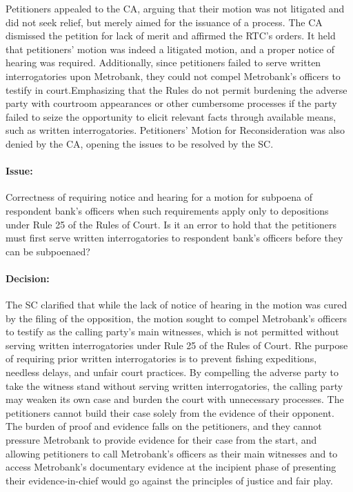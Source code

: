 \documentclass[
12pt,
oneside,
onehalfspacing,
headsepline
]{DigestCollection}
\begin{document}
Petitioners appealed to the CA, arguing that their motion was not litigated and did not seek relief, but merely aimed for the issuance of a process. The CA dismissed the petition for lack of merit and affirmed the RTC's orders. It held that petitioners' motion was indeed a litigated motion, and a proper notice of hearing was required. Additionally, since petitioners failed to serve written interrogatories upon Metrobank, they could not compel Metrobank's officers to testify in court.Emphasizing that the Rules do not permit burdening the adverse party with courtroom appearances or other cumbersome processes if the party failed to seize the opportunity to elicit relevant facts through available means, such as written interrogatories. Petitioners' Motion for Reconsideration was also denied by the CA, opening the issues to be resolved by the SC.

\paragraph{Issue:}
\label{07a37230-09fe-11ef-932c-63c852f65e48}


Correctness of requiring notice and hearing for a motion for subpoena of respondent bank's officers when such requirements apply only to depositions under Rule 25 of the Rules of Court. Is it an error to hold that the petitioners must first serve written interrogatories to respondent bank's officers before they can be subpoenaed?

\paragraph{Decision:}
\label{0982e090-09fe-11ef-932c-63c852f65e48}


The SC clarified that while the lack of notice of hearing in the motion was cured by the filing of the opposition, the motion sought to compel Metrobank's officers to testify as the calling party's main witnesses, which is not permitted without serving written interrogatories under Rule 25 of the Rules of Court. Rhe purpose of requiring prior written interrogatories is to prevent fishing expeditions, needless delays, and unfair court practices. By compelling the adverse party to take the witness stand without serving written interrogatories, the calling party may weaken its own case and burden the court with unnecessary processes. The petitioners cannot build their case solely from the evidence of their opponent. The burden of proof and evidence falls on the petitioners, and they cannot pressure Metrobank to provide evidence for their case from the start, and allowing petitioners to call Metrobank's officers as their main witnesses and to access Metrobank's documentary evidence at the incipient phase of presenting their evidence-in-chief would go against the principles of justice and fair play. 
\end{document}
